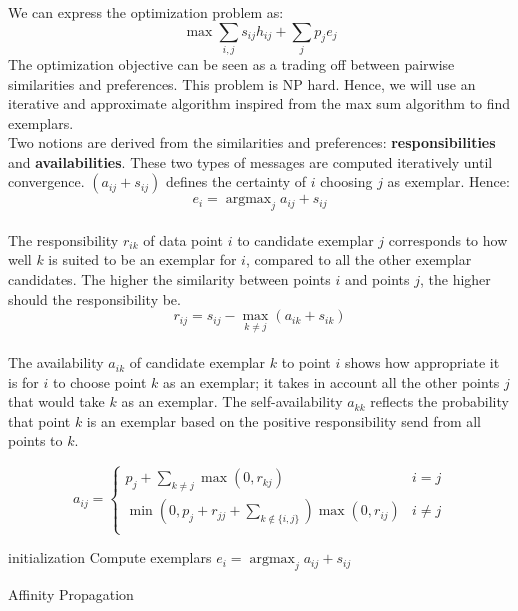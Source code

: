 \documentclass{ipol}
\DeclareMathOperator{\argmax}{argmax}
\begin{document}
We can express the optimization problem as:
\begin{equation*}
\max \sum_{i, j} s_{ij} h_{ij} + \sum_{j} p_j e_j
\end{equation*}
The optimization objective can be seen as a trading off between pairwise
similarities and preferences. This problem is NP hard. Hence, we will use an
iterative and approximate algorithm inspired from the max sum algorithm to
find exemplars. \\
Two notions are derived from the similarities and preferences:
\textbf{responsibilities} and \textbf{availabilities}. These two types of
messages are computed iteratively until convergence.
$(a_{ij} + s_{ij})$ defines the certainty of $i$ choosing $j$ as exemplar.
Hence:
\begin{equation*}
e_i = \argmax_j a_{ij} + s_{ij}
\end{equation*}
\\
The responsibility $r_{ik}$ of data point $i$ to
candidate exemplar $j$ corresponds to how well $k$ is suited to be an exemplar
for $i$, compared to all the other exemplar candidates. The higher the
similarity between points $i$ and points $j$, the higher should the
responsibility be.
\begin{equation*}
r_{ij} = s_{ij} - \max_{k \neq j} (a_{ik} + s_{ik})
\end{equation*}
\\
The availability $a_{ik}$ of candidate exemplar $k$ to point $i$ shows how
appropriate it is for $i$ to choose point $k$ as an exemplar; it takes in account
all the other points $j$ that would take $k$ as an exemplar. The
self-availability $a_{kk}$ reflects the probability that point $k$ is an
exemplar based on the positive responsibility send from all points to $k$.

\begin{equation*}
a_{ij} = \begin{cases}
	    p_j + \sum_{k \neq j} \max(0, r_{kj}) &  i = j \\
	    \min ( 0, p_j + r_{jj} + \sum_{k \notin \{i, j\} } ) \max (0, r_{ij})
	    & i \neq j\\
	 \end{cases}
\end{equation*}


\begin{algorithm}[H]
  \SetLine
  initialization\;
  Compute exemplars $e_i = \argmax_{j} a_{ij} + s_{ij}$ \;
  \caption{Affinity Propagation}
\end{algorithm}
\end{document}
